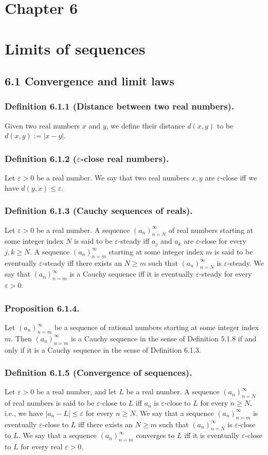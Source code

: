 \documentclass[12pt, letter]{article}
\begin{document}
\section*{Chapter 6}
\section*{Limits of sequences}
\subsection*{6.1 Convergence and limit laws}
\subsubsection*{Definition 6.1.1 (Distance between two real numbers).}
Given two real numbers $x$ and $y$, we define their distance $d(x,y)$ to be $d(x,y):=|x-y|$.
\subsubsection*{Definition 6.1.2 ($\varepsilon$-close real numbers).}
Let $\varepsilon>0$ be a real number. We say that two real numbers $x,y$ are $\varepsilon$-close iff we have $d(y,x)\leq \varepsilon$.
\subsubsection*{Definition 6.1.3 (Cauchy sequences of reals).}
Let $\varepsilon>0$ be a real number. A sequence $(a_n)_{n=N}^\infty$ of real numbers starting at some integer index $N$ is said to be $\varepsilon$-steady
iff $a_j$ and $a_k$ are $\varepsilon$-close for every $j,k\geq N$. A sequence $(a_n)_{n=m}^\infty$ starting at some integer index $m$ is said to be
eventually $\varepsilon$-steady iff there exists an $N\geq m$ such that $(a_n)_{n=N}^\infty$ is $\varepsilon$-steady. We say that $(a_n)_{n=m}^\infty$
is a Cauchy sequence iff it is eventually $\varepsilon$-steady for every $\varepsilon>0$. 
\subsubsection*{Proposition 6.1.4.}
Let $(a_n)_{n=m}^\infty$ be a sequence of rational numbers starting at some integer index $m$. Then $(a_n)_{n=m}^\infty$ is a Cauchy sequence 
in the sense of Definition 5.1.8 if and only if it is a Cauchy sequence in the sense of Definition 6.1.3.
\subsubsection*{Definition 6.1.5 (Convergence of sequences).}
Let $\varepsilon>0$ be a real number, and let $L$ be a real number. A sequence $(a_n)_{n=N}^\infty$ of real numbers is said to be $\varepsilon$-close
to $L$ iff $a_n$ is $\varepsilon$-close to $L$ for every $n\geq N$, i.e., we have $|a_n-L|\leq \varepsilon$ for every $n\geq N$. We say that a sequence $(a_n)_{n=m}^\infty$
is eventually $\varepsilon$-close to $L$ iff there exists an $N\geq m$ such that $(a_n)_{n=N}^\infty$ is $\varepsilon$-close to $L$. We say that a sequence
$(a_n)_{n=m}^\infty$ converges to $L$ iff it is eventually $\varepsilon$-close to $L$ for every real $\varepsilon>0$.
\end{document}
